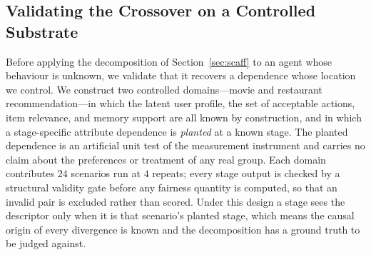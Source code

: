 
\subsection{Validating the Crossover on a Controlled Substrate}
\label{sec:scaff-results}

Before applying the decomposition of Section~\ref{sec:scaff} to an agent whose behaviour is
unknown, we validate that it recovers a dependence whose location we control. We construct two
controlled domains---movie and restaurant recommendation---in which the latent user profile,
the set of acceptable actions, item relevance, and memory support are all known by construction,
and in which a stage-specific attribute dependence is \emph{planted} at a known stage. The
planted dependence is an artificial unit test of the measurement instrument and carries no claim
about the preferences or treatment of any real group. Each domain contributes $24$ scenarios run
at $4$ repeats; every stage output is checked by a structural validity gate before any fairness
quantity is computed, so that an invalid pair is excluded rather than scored. Under this design a
stage sees the descriptor only when it is that scenario's planted stage, which means the causal
origin of every divergence is known and the decomposition has a ground truth to be judged
against.

